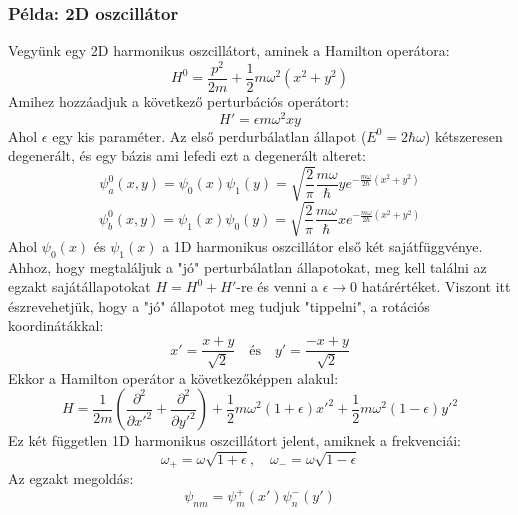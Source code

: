 \documentclass[../main.tex]{subfiles}
\begin{document}
\subsubsection*{Példa: 2D oszcillátor}
Vegyünk egy 2D harmonikus oszcillátort, aminek a Hamilton operátora:
\begin{equation}
    H^0 = \frac{p^2}{2m} + \frac{1}{2} m \omega^2 (x^2 + y^2)
\end{equation}
Amihez hozzáadjuk a következő perturbációs operátort:
\begin{equation}
    H' = \epsilon m \omega^2 x y
\end{equation}
Ahol $\epsilon$ egy kis paraméter. Az első perdurbálatlan állapot ($E^0 = 2 \hbar \omega$) kétszeresen degenerált, és egy bázis ami lefedi ezt a degenerált alteret:
\begin{equation}
    \psi_a^0 (x,y) = \psi_0 (x) \psi_1 (y) = \sqrt{\frac{2}{\pi}} \frac{m \omega}{\hbar} y e^{-\frac{m \omega}{2 \hbar} (x^2 + y^2)}
\end{equation}
\begin{equation}
    \psi_b^0 (x,y) = \psi_1 (x) \psi_0 (y) = \sqrt{\frac{2}{\pi}} \frac{m \omega}{\hbar} x e^{-\frac{m \omega}{2 \hbar} (x^2 + y^2)}
\end{equation}
Ahol $\psi_0(x)$ és $\psi_1(x)$ a 1D harmonikus oszcillátor első két sajátfüggvénye. Ahhoz, hogy megtaláljuk a "jó" perturbálatlan állapotokat, meg kell találni az egzakt sajátállapotokat $H = H^0 + H'$-re és venni a $\epsilon \to 0$ határértéket.
Viszont itt észrevehetjük, hogy a "jó" állapotot meg tudjuk "tippelni", a rotációs koordinátákkal:
\begin{equation}
    x' = \frac{x + y}{\sqrt{2}} \quad \text{és} \quad y' = \frac{-x + y}{\sqrt{2}}
\end{equation}
Ekkor a Hamilton operátor a következőképpen alakul:
\begin{equation}
    H = \frac{1}{2m} \left(\frac{\partial^2}{\partial x'^2} + \frac{\partial^2}{\partial y'^2}\right) + \frac{1}{2}m \omega^2 (1 + \epsilon) x'^2 + \frac{1}{2} m \omega^2 (1 - \epsilon) y'^2
\end{equation}
Ez két független 1D harmonikus oszcillátort jelent, amiknek a frekvenciái:
\begin{equation}
    \omega_+ = \omega \sqrt{1 + \epsilon}, \quad \omega_- = \omega \sqrt{1 - \epsilon}
\end{equation}
Az egzakt megoldás:
\begin{equation}
    \psi_{nm} = \psi_m^+ (x') \psi_n^- (y')
\end{equation}
\end{document}

